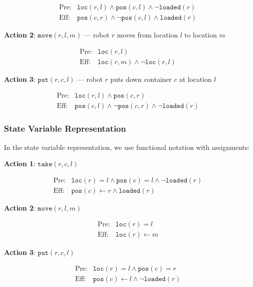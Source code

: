 \documentclass[11pt,a4paper]{article}
\theoremstyle{definition}
\theoremstyle{plain}
\theoremstyle{remark}
\begin{document}
\[
\begin{array}{ll}
\text{Pre:} & \texttt{loc}(r, l) \land \texttt{pos}(c, l) \land \neg \texttt{loaded}(r) \\
\text{Eff:} & \texttt{pos}(c, r) \land \neg \texttt{pos}(c, l) \land \texttt{loaded}(r)
\end{array}
\]

\textbf{Action 2}: $\texttt{move}(r, l, m)$ — robot $r$ moves from location $l$ to location $m$

\[
\begin{array}{ll}
\text{Pre:} & \texttt{loc}(r, l) \\
\text{Eff:} & \texttt{loc}(r, m) \land \neg \texttt{loc}(r, l)
\end{array}
\]

\textbf{Action 3}: $\texttt{put}(r, c, l)$ — robot $r$ puts down container $c$ at location $l$

\[
\begin{array}{ll}
\text{Pre:} & \texttt{loc}(r, l) \land \texttt{pos}(c, r) \\
\text{Eff:} & \texttt{pos}(c, l) \land \neg \texttt{pos}(c, r) \land \neg \texttt{loaded}(r)
\end{array}
\]

\subsubsection{State Variable Representation}

In the state variable representation, we use functional notation with assignments:

\textbf{Action 1}: $\texttt{take}(r, c, l)$

\[
\begin{array}{ll}
\text{Pre:} & \texttt{loc}(r) = l \land \texttt{pos}(c) = l \land \neg \texttt{loaded}(r) \\
\text{Eff:} & \texttt{pos}(c) \leftarrow r \land \texttt{loaded}(r)
\end{array}
\]

\textbf{Action 2}: $\texttt{move}(r, l, m)$

\[
\begin{array}{ll}
\text{Pre:} & \texttt{loc}(r) = l \\
\text{Eff:} & \texttt{loc}(r) \leftarrow m
\end{array}
\]

\textbf{Action 3}: $\texttt{put}(r, c, l)$

\[
\begin{array}{ll}
\text{Pre:} & \texttt{loc}(r) = l \land \texttt{pos}(c) = r \\
\text{Eff:} & \texttt{pos}(c) \leftarrow l \land \neg \texttt{loaded}(r)
\end{array}
\]
\end{document}

